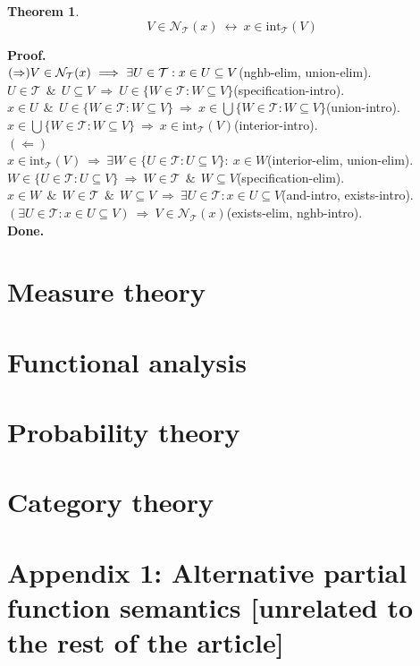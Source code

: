 \documentclass[10pt,a4paper]{article}
\theoremstyle{definition}
\newtheorem{theorem}{Theorem}[section]
\newcommand*{\separation}[3]{%
  \{#1\in #2: #3\}
}
\newcommand{\AND}{\ \ \&\ \ }
\newcommand{\Done}{\noindent \textbf{Done.}\\}
\renewcommand{\iff}{\ \longleftrightarrow\ }
\newcommand{\IMPLIES}{\ \Longrightarrow\ }
\newcommand{\interior}{\mbox{int}}
\newcommand{\nghbset}{\mathcal{N}}
\newcommand{\Proof}{\noindent \textbf{Proof.}\\}
\newcommand{\topology}{\mathcal{T}}
\newcommand{\union}{\bigcup}
\begin{document}
\newcommand*{\blipo}{\separation{W}{\topology}{W\subseteq V}}
\begin{theorem}
\[
V\in\nghbset_\topology(x) \iff x\in \interior_\topology(V)
\]
\end{theorem}
\Proof
$(\Rightarrow)\\
V\in \nghbset_\topology(x) \IMPLIES \exists U\in \topology: x\in U \subseteq V$\hfill(nghb-elim, union-elim).
\\
$U\in\topology\AND U\subseteq V \IMPLIES U \in \blipo $\hfill(specification-intro).
\\
$x\in U \AND U \in \blipo \IMPLIES x\in \union \blipo$\hfill(union-intro).
\\
$x\in \union \blipo \IMPLIES x\in \interior_\topology(V)$\hfill(interior-intro).
\\
$(\Leftarrow)$
\\
$x\in \interior_\topology(V) \IMPLIES \exists W\in  \{U\in\topology :U\subseteq V\}:\ x\in W$\hfill(interior-elim, union-elim).
\\
$W\in  \{U\in\topology:U\subseteq V\} \IMPLIES W\in\topology\AND W\subseteq V$\hfill(specification-elim).
\\
$x\in W\AND W\in\topology\AND W\subseteq V \IMPLIES \exists U\in \topology: x\in U \subseteq V$\hfill(and-intro, exists-intro).
\\
$(\exists U\in \topology: x\in U \subseteq V) \IMPLIES V\in \nghbset_\topology(x)$\hfill(exists-elim, nghb-intro).
\\
\Done
\section{Measure theory}
\section{Functional analysis}
\section{Probability theory}
\section{Category theory}
\fi
\pagebreak
\section{Appendix 1: Alternative partial function semantics [unrelated to the rest of the article]}
\end{document}
